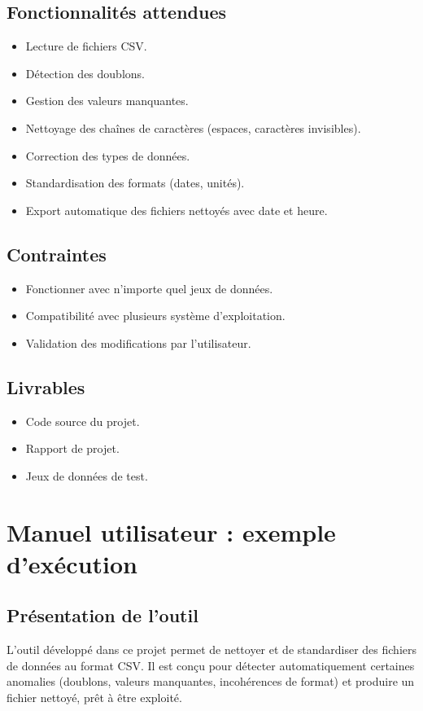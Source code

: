 \documentclass[a4paper, 12pt, twoside]{article}
\begin{document}
\subsection*{Fonctionnalités attendues}
\begin{itemize}
    \item Lecture de fichiers CSV.
    \item Détection des doublons.
    \item Gestion des valeurs manquantes.
    \item Nettoyage des chaînes de caractères (espaces, caractères invisibles).
    \item Correction des types de données.
    \item Standardisation des formats (dates, unités).
    \item Export automatique des fichiers nettoyés avec date et heure.
\end{itemize}

\subsection*{Contraintes}
\begin{itemize}
    \item Fonctionner avec n'importe quel jeux de données.
    \item Compatibilité avec plusieurs système d'exploitation.
    \item Validation des modifications par l'utilisateur.
\end{itemize}

\subsection*{Livrables}
\begin{itemize}
    \item Code source du projet.
    \item Rapport de projet.
    \item Jeux de données de test.
\end{itemize}

\newpage
	\section{Manuel utilisateur : exemple d'exécution}
\subsection*{Présentation de l’outil}
L’outil développé dans ce projet permet de nettoyer et de standardiser des fichiers de données au format CSV. Il est conçu pour détecter automatiquement certaines anomalies (doublons, valeurs manquantes, incohérences de format) et produire un fichier nettoyé, prêt à être exploité.
\end{document}
